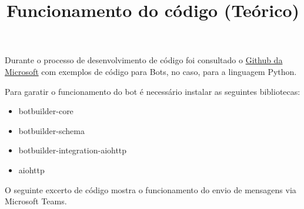 \title*{\textbf{Funcionamento do código (Teórico)}}

Durante o processo de desenvolvimento de código foi consultado o \href{https://github.com/microsoft/BotBuilder-Samples/tree/main/samples/python/02.echo-bot}{Github da Microsoft}
com exemplos de código para Bots, no caso, para a linguagem Python.

Para garatir o funcionamento do bot é necessário instalar as seguintes bibliotecas:
\begin{itemize}
    \item botbuilder-core
    \item botbuilder-schema
    \item botbuilder-integration-aiohttp
    \item aiohttp
\end{itemize}


O seguinte excerto de código mostra o funcionamento do envio de mensagens via Microsoft Teams.

